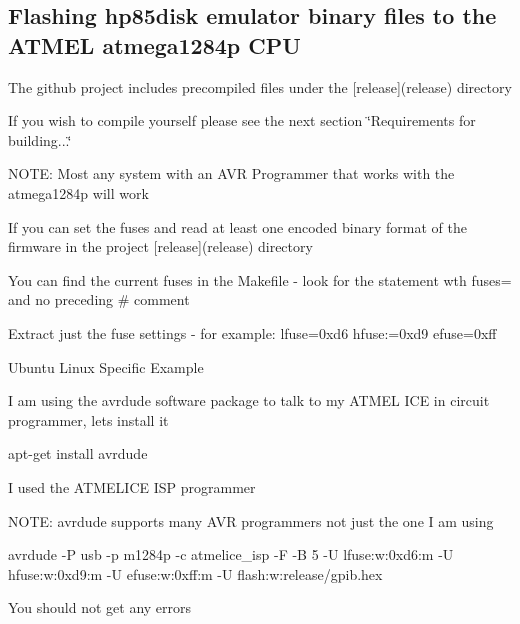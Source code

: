 \subsection*{Flashing hp85disk emulator binary files to the A\+T\+M\+EL atmega1284p C\+PU}


\begin{DoxyItemize}
\item The github project includes precompiled files under the \mbox{[}release\mbox{]}(release) directory
\begin{DoxyItemize}
\item If you wish to compile yourself please see the next section \char`\"{}\+Requirements for building...\char`\"{}
\end{DoxyItemize}
\item N\+O\+TE\+: Most any system with an A\+VR Programmer that works with the atmega1284p will work
\begin{DoxyItemize}
\item If you can set the fuses and read at least one encoded binary format of the firmware in the project \mbox{[}release\mbox{]}(release) directory
\begin{DoxyItemize}
\item You can find the current fuses in the Makefile -\/ look for the statement wth fuses= and no preceding \textquotesingle{}\#\textquotesingle{} comment
\item Extract just the fuse settings -\/ for example\+: lfuse=0xd6 hfuse\+:=0xd9 efuse=0xff
\end{DoxyItemize}
\end{DoxyItemize}
\item Ubuntu Linux Specific Example
\begin{DoxyItemize}
\item I am using the avrdude software package to talk to my A\+T\+M\+EL I\+CE in circuit programmer, lets install it
\begin{DoxyItemize}
\item apt-\/get install avrdude
\end{DoxyItemize}
\item I used the A\+T\+M\+E\+L\+I\+CE I\+SP programmer
\begin{DoxyItemize}
\item N\+O\+TE\+: avrdude supports many A\+VR programmers not just the one I am using
\item avrdude -\/P usb -\/p m1284p -\/c atmelice\+\_\+isp -\/F -\/B 5 -\/U lfuse\+:w\+:0xd6\+:m -\/U hfuse\+:w\+:0xd9\+:m -\/U efuse\+:w\+:0xff\+:m -\/U flash\+:w\+:release/gpib.\+hex
\begin{DoxyItemize}
\item You should not get any errors 


\end{DoxyItemize}
\end{DoxyItemize}
\end{DoxyItemize}
\end{DoxyItemize}

